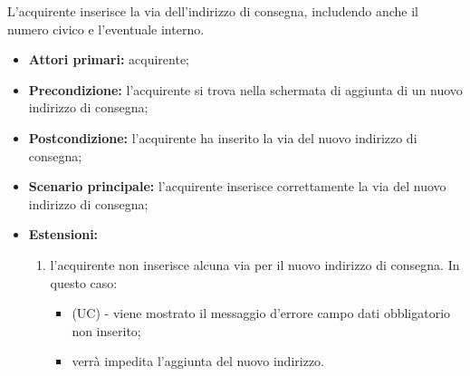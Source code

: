 L'acquirente inserisce la via dell'indirizzo di consegna, includendo anche il numero civico e l'eventuale interno.
\begin{itemize}
    \item \textbf{Attori primari:} acquirente;
    \item \textbf{Precondizione:} l'acquirente si trova nella schermata di aggiunta di un nuovo indirizzo di consegna;
    \item \textbf{Postcondizione:} l'acquirente ha inserito la via del nuovo indirizzo di consegna;
    \item \textbf{Scenario principale:} l'acquirente inserisce correttamente la via del nuovo indirizzo di consegna;
    \item \textbf{Estensioni:}
    \begin{enumerate}[label=\lett]
        \item l'acquirente non inserisce alcuna via per il nuovo indirizzo di consegna. In questo caso:
        \begin{itemize}
            \item (UC) - viene mostrato il messaggio d'errore campo dati obbligatorio non inserito;
            \item verrà impedita l'aggiunta del nuovo indirizzo.
        \end{itemize}
    \end{enumerate}
\end{itemize}

